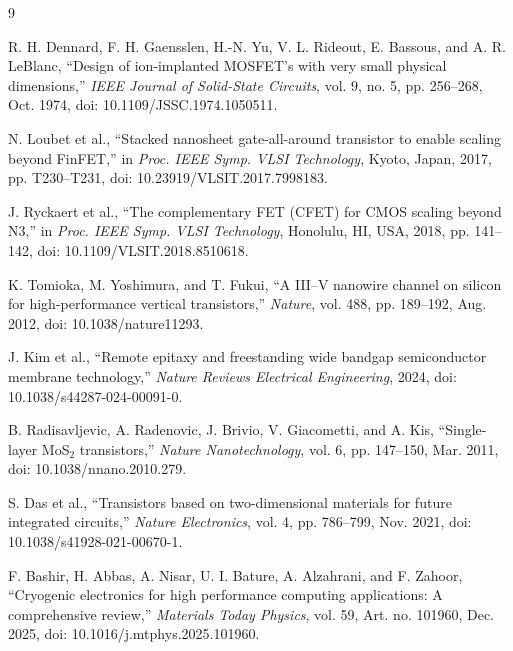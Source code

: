\documentclass[10pt,a4paper]{article}
\begin{document}
	\begin{thebibliography}{9}
		
		R. H. Dennard, F. H. Gaensslen, H.-N. Yu, V. L. Rideout, E. Bassous, and A. R. LeBlanc,
		``Design of ion-implanted MOSFET's with very small physical dimensions,''
		\textit{IEEE Journal of Solid-State Circuits},
		vol. 9, no. 5, pp. 256--268, Oct. 1974,
		doi: 10.1109/JSSC.1974.1050511.
		
		N. Loubet et al.,
		``Stacked nanosheet gate-all-around transistor to enable scaling beyond FinFET,''
		in \textit{Proc. IEEE Symp. VLSI Technology},
		Kyoto, Japan, 2017, pp. T230--T231,
		doi: 10.23919/VLSIT.2017.7998183.
		
		J. Ryckaert et al.,
		``The complementary FET (CFET) for CMOS scaling beyond N3,''
		in \textit{Proc. IEEE Symp. VLSI Technology},
		Honolulu, HI, USA, 2018, pp. 141--142,
		doi: 10.1109/VLSIT.2018.8510618.
		
		K. Tomioka, M. Yoshimura, and T. Fukui,
		``A III--V nanowire channel on silicon for high-performance vertical transistors,''
		\textit{Nature},
		vol. 488, pp. 189--192, Aug. 2012,
		doi: 10.1038/nature11293.
		
		J. Kim et al.,
		``Remote epitaxy and freestanding wide bandgap semiconductor membrane technology,''
		\textit{Nature Reviews Electrical Engineering},
		2024,
		doi: 10.1038/s44287-024-00091-0.
		
		B. Radisavljevic, A. Radenovic, J. Brivio, V. Giacometti, and A. Kis,
		``Single-layer MoS$_2$ transistors,''
		\textit{Nature Nanotechnology},
		vol. 6, pp. 147--150, Mar. 2011,
		doi: 10.1038/nnano.2010.279.
		
		S. Das et al.,
		``Transistors based on two-dimensional materials for future integrated circuits,''
		\textit{Nature Electronics},
		vol. 4, pp. 786--799, Nov. 2021,
		doi: 10.1038/s41928-021-00670-1.
		
		F. Bashir, H. Abbas, A. Nisar, U. I. Bature, A. Alzahrani, and F. Zahoor,
		``Cryogenic electronics for high performance computing applications: A comprehensive review,''
		\textit{Materials Today Physics},
		vol. 59, Art. no. 101960, Dec. 2025,
		doi: 10.1016/j.mtphys.2025.101960.
		
	\end{thebibliography}
	
\end{document}
